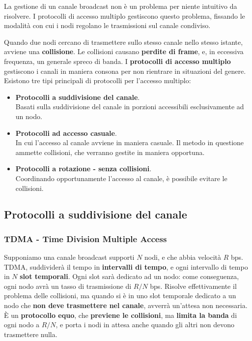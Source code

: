 La gestione di un canale broadcast non è un problema per niente intuitivo da risolvere. I protocolli di accesso multiplo gestiscono questo problema, fissando le modalità con cui i nodi regolano le trasmissioni sul canale condiviso.

Quando due nodi cercano di trasmettere sullo stesso canale nello stesso istante, avviene una \textbf{collisione}. Le collisioni causano \textbf{perdite di frame}, e, in eccessiva frequenza, un generale spreco di banda. I \textbf{protocolli di accesso multiplo} gestiscono i canali in maniera consona per non rientrare in situazioni del genere. Esistono tre tipi principali di protocolli per l'accesso multiplo:

\begin{itemize}
	\item \textbf{Protocolli a suddivisione del canale}.\\
	Basati sulla suddivisione del canale in porzioni accessibili esclusivamente ad un nodo.
	\item \textbf{Protocolli ad accesso casuale}.\\
	In cui l'accesso al canale avviene in maniera casuale. Il metodo in questione ammette collisioni, che verranno gestite in maniera opportuna.
	\item \textbf{Protocolli a rotazione - senza collisioni}.\\
	Coordinando opportunamente l’accesso al canale, è possibile evitare le collisioni.
\end{itemize}

\subsection{Protocolli a suddivisione del canale}

\subsubsection{TDMA - Time Division Multiple Access}
Supponiamo una canale broadcast supporti $N$ nodi, e che abbia velocità $R$ bps.\\
TDMA, suddividerà il tempo in \textbf{intervalli di tempo}, e ogni intervallo di tempo in $N$ \textbf{slot temporali}. Ogni slot sarà dedicato ad un nodo: come conseguenza, ogni nodo avrà un tasso di trasmissione di $R/N$ bps. Risolve effettivamente il problema delle collisioni, ma quando si è in uno slot temporale dedicato a un nodo che \textbf{non deve trasmettere nel canale}, avverrà un'attesa non necessaria. 
È un \textbf{protocollo equo}, che \textbf{previene le collisioni}, ma \textbf{limita la banda} di ogni nodo a $R/N$, e porta i nodi in attesa anche quando gli altri non devono trasmettere nulla.

